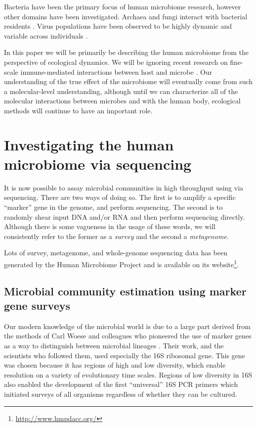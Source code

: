 \documentclass{amsart}
\begin{document}
Bacteria have been the primary focus of human microbiome research, however other domains have been investigated.
Archaea and fungi interact with bacterial residents \citep{hoffmann2013archaea}.
Virus populations have been observed to be highly dynamic and variable across individuals \citep{reyes2010viruses,minot2011human,minot2013rapid}.

In this paper we will be primarily be describing the human microbiome from the perspective of ecological dynamics.
We will be ignoring recent research on fine-scale immune-mediated interactions between host and microbe \citep[reviewed in][]{hooper2012interactions}.
Our understanding of the true effect of the microbiome will eventually come from such a molecular-level understanding, although until we can characterize all of the molecular interactions between microbes and with the human body, ecological methods will continue to have an important role.


\section{Investigating the human microbiome via sequencing}
It is now possible to assay microbial communities in high throughput using via sequencing.
There are two ways of doing so.
The first is to amplify a specific ``marker'' gene in the genome, and perform sequencing.
The second is to randomly shear input DNA and/or RNA and then perform sequencing directly.
Although there is some vagueness in the usage of these words, we will consistently refer to the former as a \textit{survey} and the second a \textit{metagenome}.

Lots of survey, metagenome, and whole-genome sequencing data has been generated by the Human Microbiome Project \citep{methe2012framework} and is available on its website\footnote{\url{http://www.hmpdacc.org/}}.

\subsection{Microbial community estimation using marker gene surveys}
Our modern knowledge of the microbial world is due to a large part derived from the methods of Carl Woese and colleagues who pioneered the use of marker genes as a way to distinguish between microbial lineages \citep{fox1977comparative}.
Their work, and the scientists who followed them, used especially the 16S ribosomal gene.
This gene was chosen because it has regions of high and low diversity, which enable resolution on a variety of evolutionary time scales.
Regions of low diversity in 16S also enabled the development of the first ``universal'' 16S PCR primers \citep{lane1985rapid} which initiated surveys of all organisms regardless of whether they can be cultured.
\end{document}
